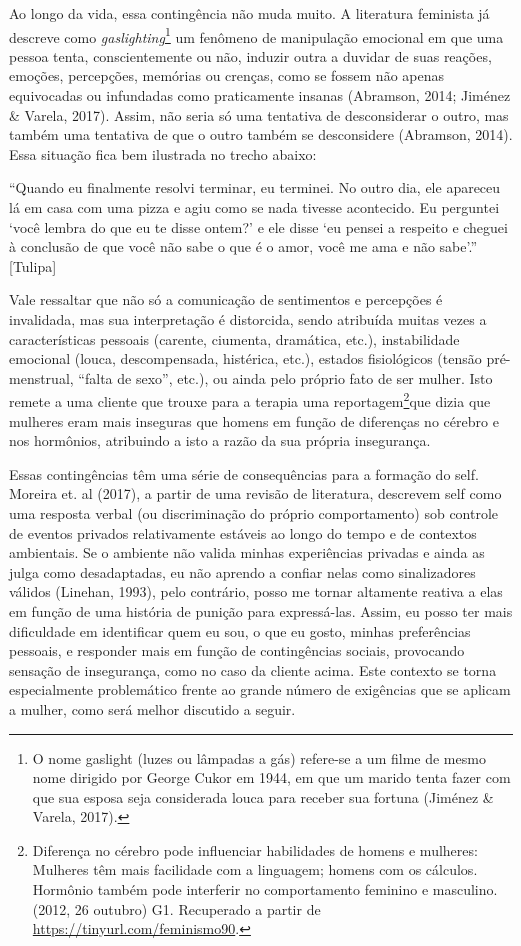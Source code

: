 Ao longo da vida, essa contingência não muda muito. A literatura feminista já descreve como \textit{gaslighting}\footnote{O nome gaslight (luzes ou lâmpadas a gás) refere-se a um filme de mesmo nome dirigido por George Cukor em 1944, em que um marido tenta fazer com que sua esposa seja considerada louca para receber sua fortuna (Jiménez \& Varela, 2017).} um fenômeno de manipulação emocional em que uma pessoa tenta, conscientemente ou não, induzir outra a duvidar de suas reações, emoções, percepções, memórias ou crenças, como se fossem não apenas equivocadas ou infundadas como praticamente insanas (Abramson, 2014; Jiménez \& Varela, 2017). Assim, não seria só uma tentativa de desconsiderar o outro, mas também uma tentativa de que o outro também se desconsidere (Abramson, 2014). Essa situação fica bem ilustrada no trecho abaixo:

``Quando eu finalmente resolvi terminar, eu terminei. No outro dia, ele apareceu lá em casa com uma pizza e agiu como se nada tivesse acontecido. Eu perguntei ‘você lembra do que eu te disse ontem?’ e ele disse ‘eu pensei a respeito e cheguei à conclusão de que você não sabe o que é o amor, você me ama e não sabe’.'' [Tulipa]

Vale ressaltar que não só a comunicação de sentimentos e percepções é invalidada, mas sua interpretação é distorcida, sendo atribuída muitas vezes a características pessoais (carente, ciumenta, dramática, etc.), instabilidade emocional (louca, descompensada, histérica, etc.), estados fisiológicos (tensão pré-menstrual, ``falta de sexo'', etc.), ou ainda pelo próprio fato de ser mulher. Isto remete a uma cliente que trouxe para a terapia uma reportagem\footnote{Diferença no cérebro pode influenciar habilidades de homens e mulheres: Mulheres têm mais facilidade com a linguagem; homens com os cálculos. Hormônio também pode interferir no comportamento feminino e masculino. (2012, 26 outubro) G1. Recuperado a partir de \url{https://tinyurl.com/feminismo90}.}que dizia que mulheres eram mais inseguras que homens em função de diferenças no cérebro e nos hormônios, atribuindo a isto a razão da sua própria insegurança.

Essas contingências têm uma série de consequências para a formação do self. Moreira et. al (2017), a partir de uma revisão de literatura, descrevem self como uma resposta verbal (ou discriminação do próprio comportamento) sob controle de eventos privados relativamente estáveis ao longo do tempo e de contextos ambientais. Se o ambiente não valida minhas experiências privadas e ainda as julga como desadaptadas, eu não aprendo a confiar nelas como sinalizadores válidos (Linehan, 1993), pelo contrário, posso me tornar altamente reativa a elas em função de uma história de punição para expressá-las. Assim, eu posso ter mais dificuldade em identificar quem eu sou, o que eu gosto, minhas preferências pessoais, e responder mais em função de contingências sociais, provocando sensação de insegurança, como no caso da cliente acima. Este contexto se torna especialmente problemático frente ao grande número de exigências que se aplicam a mulher, como será melhor discutido a seguir. 

